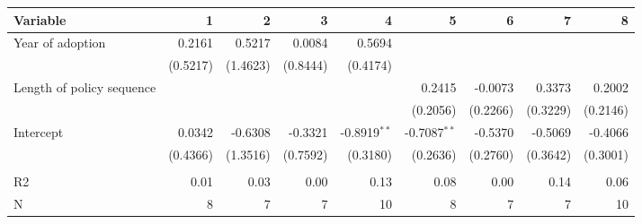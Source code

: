 \begin{tabular}{lrrrrrrrr}
\toprule
                  Variable &         1 &         2 &         3 &                4 &                5 &         6 &         7 &         8 \\
\midrule
          Year of adoption &    0.2161 &    0.5217 &    0.0084 &           0.5694 &                  &           &           &           \\
                           &  (0.5217) &  (1.4623) &  (0.8444) &         (0.4174) &                  &           &           &           \\
 Length of policy sequence &           &           &           &                  &           0.2415 &   -0.0073 &    0.3373 &    0.2002 \\
                           &           &           &           &                  &         (0.2056) &  (0.2266) &  (0.3229) &  (0.2146) \\
                 Intercept &    0.0342 &   -0.6308 &   -0.3321 &  -0.8919$^{* *}$ &  -0.7087$^{* *}$ &   -0.5370 &   -0.5069 &   -0.4066 \\
                           &  (0.4366) &  (1.3516) &  (0.7592) &         (0.3180) &         (0.2636) &  (0.2760) &  (0.3642) &  (0.3001) \\
                           &           &           &           &                  &                  &           &           &           \\
                        R2 &      0.01 &      0.03 &      0.00 &             0.13 &             0.08 &      0.00 &      0.14 &      0.06 \\
                         N &         8 &         7 &         7 &               10 &                8 &         7 &         7 &        10 \\
\bottomrule
\end{tabular}
